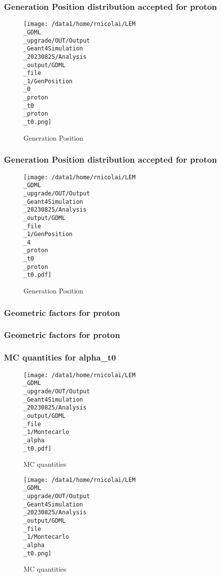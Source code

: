 \documentclass[8pt]{beamer}
\begin{document}
            \begin{frame}
                \frametitle{Generation Position distribution accepted for proton}
            
        \begin{figure}[h]
            \centering
            \texttt{[image: /data1/home/rnicolai/LEM\\\_GDML\\\_upgrade/OUT/Output\\\_Geant4Simulation\\\_20230825/Analysis\\\_output/GDML\\\_file\\\_1/GenPosition\\\_0\\\_proton\\\_t0\\\_proton\\\_t0.png]}
            \caption{Generation Position}
        \end{figure}
        
            \end{frame}
            
            \begin{frame}
                \frametitle{Generation Position distribution accepted for proton}
            
        \begin{figure}[h]
            \centering
            \texttt{[image: /data1/home/rnicolai/LEM\\\_GDML\\\_upgrade/OUT/Output\\\_Geant4Simulation\\\_20230825/Analysis\\\_output/GDML\\\_file\\\_1/GenPosition\\\_4\\\_proton\\\_t0\\\_proton\\\_t0.pdf]}
            \caption{Generation Position}
        \end{figure}
        
            \end{frame}
            
            \begin{frame}
                \frametitle{Geometric factors for proton}
            
            \end{frame}
            
            \begin{frame}
                \frametitle{Geometric factors for proton}
            
            \end{frame}
            
            \begin{frame}
                \frametitle{MC quantities for alpha\_t0}
            
        \begin{figure}[h]
            \centering
            \texttt{[image: /data1/home/rnicolai/LEM\\\_GDML\\\_upgrade/OUT/Output\\\_Geant4Simulation\\\_20230825/Analysis\\\_output/GDML\\\_file\\\_1/Montecarlo\\\_alpha\\\_t0.pdf]}
            \caption{MC quantities}
        \end{figure}
        
        \begin{figure}[h]
            \centering
            \texttt{[image: /data1/home/rnicolai/LEM\\\_GDML\\\_upgrade/OUT/Output\\\_Geant4Simulation\\\_20230825/Analysis\\\_output/GDML\\\_file\\\_1/Montecarlo\\\_alpha\\\_t0.png]}
            \caption{MC quantities}
        \end{figure}
        
            \end{frame}
            
\end{document}
